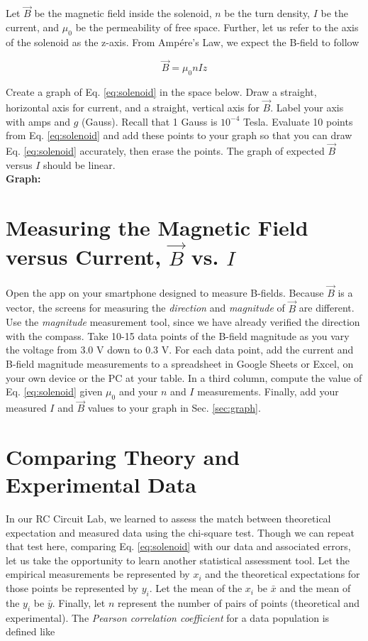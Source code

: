 \documentclass[12pt]{article}
\begin{document}
Let $\vec{B}$ be the magnetic field inside the solenoid, $n$ be the turn density, $I$ be the current, and $\mu_0$ be the permeability of free space.  Further, let us refer to the axis of the solenoid as the z-axis.  From Amp\'{e}re's Law, we expect the B-field to follow

\begin{equation}
\vec{B} = \mu_0 n I \hat{z} \label{eq:solenoid}
\end{equation}

\noindent
Create a graph of Eq. \ref{eq:solenoid} in the space below.  Draw a straight, horizontal axis for current, and a straight, vertical axis for $\vec{B}$.  Label your axis with amps and $g$ (Gauss).  Recall that 1 Gauss is $10^{-4}$ Tesla.  Evaluate 10 points from Eq. \ref{eq:solenoid} and add these points to your graph so that you can draw Eq. \ref{eq:solenoid} accurately, then erase the points. The graph of expected $\vec{B}$ versus $I$ should be linear. \\

\noindent
\textbf{Graph:}
\vspace{5cm}

\section{Measuring the Magnetic Field versus Current, $\vec{B}$ vs. $I$}

\noindent
Open the app on your smartphone designed to measure B-fields.  Because $\vec{B}$ is a vector, the screens for measuring the \textit{direction} and \textit{magnitude} of $\vec{B}$ are different.  Use the \textit{magnitude} measurement tool, since we have already verified the direction with the compass.  Take 10-15 data points of the B-field magnitude as you vary the voltage from 3.0 V down to 0.3 V.  For each data point, add the current and B-field magnitude measurements to a spreadsheet in Google Sheets or Excel, on your own device or the PC at your table.  In a third column, compute the value of Eq. \ref{eq:solenoid} given $\mu_0$ and your $n$ and $I$ measurements.  Finally, add your measured $I$ and $\vec{B}$ values to your graph in Sec. \ref{sec:graph}.

\section{Comparing Theory and Experimental Data}

\noindent
In our RC Circuit Lab, we learned to assess the match between theoretical expectation and measured data using the chi-square test.  Though we can repeat that test here, comparing Eq. \ref{eq:solenoid} with our data and associated errors, let us take the opportunity to learn another statistical assessment tool.  Let the empirical measurements be represented by $x_i$ and the theoretical expectations for those points be represented by $y_i$.  Let the mean of the $x_i$ be $\bar{x}$ and the mean of the $y_i$ be $\bar{y}$.  Finally, let $n$ represent the number of pairs of points (theoretical and experimental).  The \textit{Pearson correlation coefficient} for a data population is defined like
\end{document}
